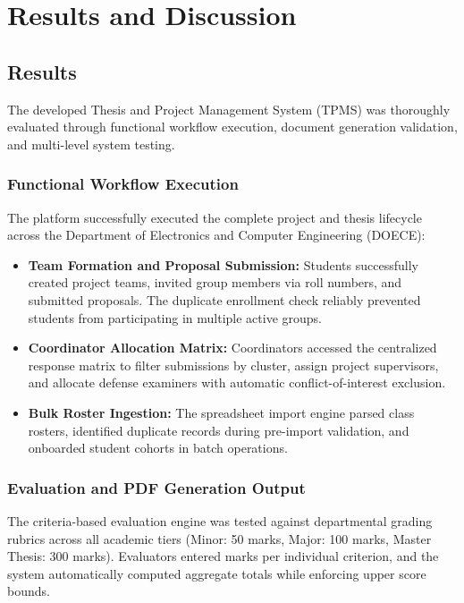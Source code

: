 \chapter{Results and Discussion}

\section{Results}
The developed Thesis and Project Management System (TPMS) was thoroughly evaluated through functional workflow execution, document generation validation, and multi-level system testing.

\subsection{Functional Workflow Execution}
The platform successfully executed the complete project and thesis lifecycle across the Department of Electronics and Computer Engineering (DOECE):
\begin{itemize}
  \item \textbf{Team Formation and Proposal Submission:} Students successfully created project teams, invited group members via roll numbers, and submitted proposals. The duplicate enrollment check reliably prevented students from participating in multiple active groups.
  
  \item \textbf{Coordinator Allocation Matrix:} Coordinators accessed the centralized response matrix to filter submissions by cluster, assign project supervisors, and allocate defense examiners with automatic conflict-of-interest exclusion.
  
  \item \textbf{Bulk Roster Ingestion:} The spreadsheet import engine parsed class rosters, identified duplicate records during pre-import validation, and onboarded student cohorts in batch operations.
\end{itemize}

\subsection{Evaluation and PDF Generation Output}
The criteria-based evaluation engine was tested against departmental grading rubrics across all academic tiers (Minor: 50 marks, Major: 100 marks, Master Thesis: 300 marks). Evaluators entered marks per individual criterion, and the system automatically computed aggregate totals while enforcing upper score bounds.

